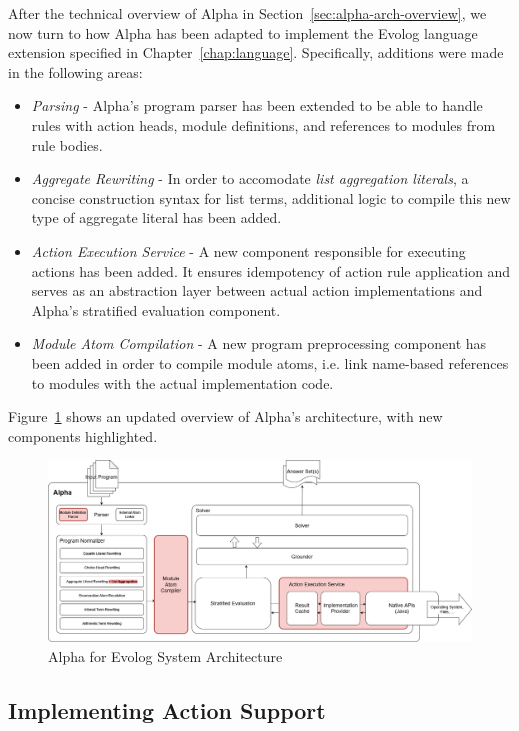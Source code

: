 After the technical overview of Alpha in Section~\ref{sec:alpha-arch-overview}, we now turn to how Alpha has been adapted to implement the Evolog language extension specified in Chapter~\ref{chap:language}. Specifically, additions were made in the following areas:
\begin{itemize}
    \item \emph{Parsing} - Alpha's program parser has been extended to be able to handle rules with action heads, module definitions, and references to modules from rule bodies.
    \item \emph{Aggregate Rewriting} - In order to accomodate \emph{list aggregation literals}, a concise construction syntax for list terms, additional logic to compile this new type of aggregate literal has been added.
    \item \emph{Action Execution Service} - A new component responsible for executing actions has been added. It ensures idempotency of action rule application and serves as an abstraction layer between actual action implementations and Alpha's stratified evaluation component.
    \item \emph{Module Atom Compilation} - A new program preprocessing component has been added in order to compile module atoms, i.e. link name-based references to modules with the actual implementation code.
\end{itemize}    
Figure~\ref{fig:alpha-evolog-arch} shows an updated overview of Alpha's architecture, with new components highlighted.

\begin{figure}[t]
    \includegraphics[width=\linewidth]{graphics/alpha-evolog-architecture.drawio.png}
    \caption{Alpha for Evolog System Architecture}
    \label{fig:alpha-evolog-arch}
\end{figure}

\subsection{Implementing Action Support}
\label{subsec:implementation-actions}

